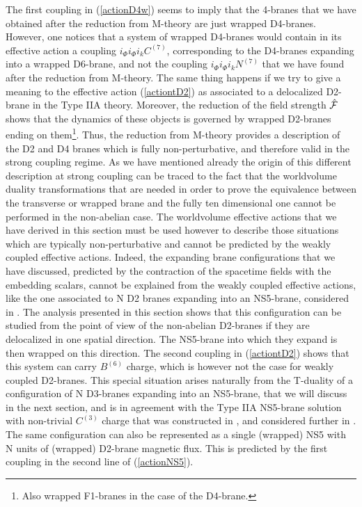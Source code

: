 \documentclass[12pt,a4paper]{article}
\begin{document}
The first coupling in (\ref{actionD4w}) seems to imply
that the 4-branes that we have obtained after the reduction
from M-theory are just wrapped D4-branes. However, one 
notices that a system of wrapped
D4-branes would contain in its effective action a coupling 
$i_\Phi i_\Phi i_k C^{(7)}$, corresponding to the D4-branes expanding
into a wrapped D6-brane, and not the coupling $i_\Phi i_\Phi i_k N^{(7)}$
that we have found after the reduction from M-theory.
The same thing happens if we try to give a meaning to the effective 
action (\ref{actiontD2})
as associated to a delocalized D2-brane in the Type 
IIA theory. Moreover, the reduction of the field strength ${\hat {\cal F}}$
shows that the dynamics of these objects is governed by wrapped D2-branes
ending on them\footnote{Also wrapped F1-branes in the case of the 
D4-brane.}. 
Thus, the reduction from M-theory provides a
description of the D2 and D4 branes  
which is fully non-perturbative, and therefore valid in the
strong coupling regime. As we have mentioned already
the origin of this different
description at strong coupling can be traced to the fact that 
the worldvolume duality transformations that are needed in order
to prove the equivalence between the transverse or wrapped brane
and the fully ten dimensional one cannot be performed in the
non-abelian case. 
The worldvolume effective actions that we have
derived in this section must be used however to describe those
situations which are typically non-perturbative and cannot be
predicted by the weakly coupled effective actions. Indeed, the expanding
brane configurations that we have discussed, predicted by the 
contraction of the spacetime fields with the embedding scalars, cannot
be explained from the weakly coupled effective actions,
like the one associated to N D2 branes expanding into an NS5-brane,
considered in \cite{Bena}. The analysis presented in this section 
shows that this configuration can be studied from the point of view of 
the non-abelian D2-branes if they are delocalized in one spatial
direction. The NS5-brane into which they expand is then wrapped on 
this direction. 
The second coupling in (\ref{actiontD2}) shows that this system 
can carry $B^{(6)}$ charge, which is however not the case for weakly
coupled D2-branes. This special situation arises naturally from the
T-duality of a configuration of N D3-branes expanding into an NS5-brane,
that we will discuss in the next section, and is in agreement with
the Type IIA NS5-brane solution with non-trivial $C^{(3)}$ charge
that was constructed in \cite{AOS}, and considered further in
\cite{Bena}. 
The same configuration can also be represented as a single (wrapped) 
NS5 with N units of (wrapped) D2-brane magnetic flux. 
This is predicted by the first coupling
in the second line of (\ref{actionNS5}).
\end{document}
